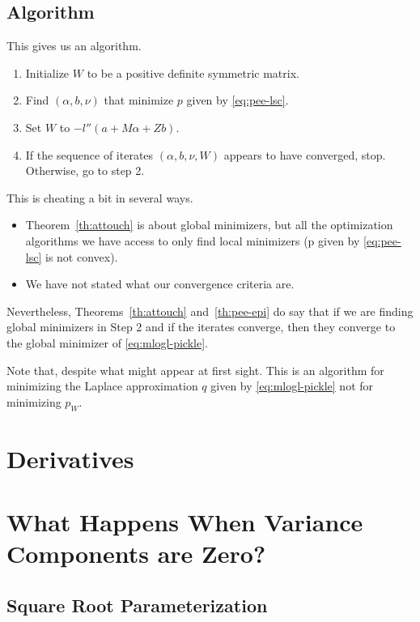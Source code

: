 \subsection{Algorithm}

This gives us an algorithm.
\begin{enumerate}
\item Initialize $W$ to be a positive definite symmetric matrix.
\item Find $(\alpha, b, \nu)$ that minimize $p$ given by \eqref{eq:pee-lsc}.
\item Set $W$ to $- l''(a + M \alpha + Z b)$.
\item If the sequence of iterates $(\alpha, b, \nu, W)$ appears
    to have converged, stop.  Otherwise, go to step 2.
\end{enumerate}

This is cheating a bit in several ways.
\begin{itemize}
\item Theorem~\ref{th:attouch} is about global minimizers, but all the
    optimization algorithms we have access to only find local minimizers
    (p given by \eqref{eq:pee-lsc} is not convex).
\item We have not stated what our convergence criteria are.
\end{itemize}

Nevertheless, Theorems~\ref{th:attouch} and~\ref{th:pee-epi} do say
that if we are finding global minimizers in Step 2 and if the iterates
converge, then they converge to the global minimizer of
\eqref{eq:mlogl-pickle}.

Note that, despite what might appear at first sight.  This is an algorithm
for minimizing the Laplace approximation $q$ given by \eqref{eq:mlogl-pickle}
not for minimizing $p_W$.

\section{Derivatives}

\REVISED

\section{What Happens When Variance Components are Zero?}

\subsection{Square Root Parameterization}

